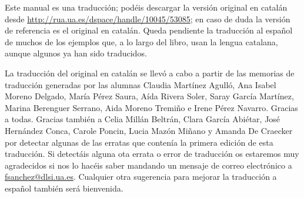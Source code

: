 Este manual es una traducción; podéis descargar la versión original en
catalán desde \url{http://rua.ua.es/dspace/handle/10045/53085}; en
caso de duda la versión de referencia es el original en catalán. Queda
pendiente la traducción al español de muchos de los ejemplos que, a lo
largo del libro, usan la lengua catalana, aunque algunos ya han sido
traducidos. 

La traducción del original en catalán se llevó a cabo a partir de las
memorias de traducción generadas por las alumnas Claudia Martínez
Agulló, Ana Isabel Moreno Delgado, María Pérez Saura, Aída Rivera
Soler, Saray García Martínez, Marina Berenguer Serrano, Aida Moreno
Tremiño e Irene Pérez Navarro. Gracias a todas. Gracias también a
Celia Millán Beltrán, Clara García Abiétar, José Hernández Conca,
Carole Poncin, Lucia Mazón Miñano y Amanda De Craecker por detectar
algunas de las erratas que contenía la primera edición de esta
traducción. Si detectáis alguna ota errata o error de traducción os
estaremos muy agradecidos si nos lo hacéis saber mandando un mensaje
de correo electrónico a \url{fsanchez@dlsi.ua.es}. Cualquier otra
sugerencia para mejorar la traducción a español también será
bienvenida.



